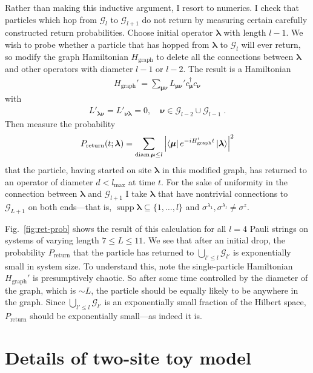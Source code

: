 \documentclass[aps,prb,nofootinbib,twocolumn,balancelastpage,amsmath,amssymb,floatfix,superscriptaddress,]{revtex4-1}
\newcommand{\graph}{\mathrm{graph}}
\DeclareMathOperator{\supp}{supp}
\DeclareMathOperator{\diam}{diam}
\newcommand{\pool}{\mathcal G}
\begin{document}
Rather than making this inductive argument, I resort to numerics.
I check that particles which hop from $\pool_l$ to $\pool_{l+1}$ do not return
by measuring certain carefully constructed return probabilities.
Choose initial operator $\bm \lambda$ with length $l-1$.
We wish to probe whether a particle that has hopped from $\bm \lambda$ to $\pool_{l}$ will ever return, so
modify the graph Hamiltonian $H_\graph$ to delete all the connections between $\bm \lambda$ and other operators with diameter $l-1$ or $l-2$.
The result is a Hamiltonian
\begin{align}
  \label{eq:Hgraph-ret-prob}
  H_\graph' =  \sum_{\bm \mu \bm \nu} L_{\bm \mu \bm \nu}' c^\dagger_{\bm \mu} c_{\bm \nu}
\end{align}
with
\begin{align}
  L'_{\bm\lambda \bm \nu} = L'_{\bm \nu \bm \lambda} = 0, \quad \bm \nu \in \pool_{l-2} \cup \pool_{l-1}\;.
\end{align}
Then measure the probability
\begin{align}
  P_{\text{return}}(t;\bm \lambda) = \sum_{\diam \bm \mu \le l} \left|\bra{\bm \mu} e^{-iH_\graph't} \ket{\bm \lambda}\right|^2
\end{align}
that the particle,
having started on site $\bm \lambda$ in this modified graph,
has returned to an operator of diameter $d < l_{\max}$ at time $t$.
For the sake of uniformity in the connection between $\bm \lambda$ and $\pool_{l+1}$
I take $\bm \lambda$ that have nontrivial connections to $\pool_{L+1}$ on both ends---that is, $\supp \bm \lambda \subseteq \{1, \dots, l\}$ and $\sigma^{\lambda_1}, \sigma^{\lambda_l} \ne \sigma^z$.

Fig.~\ref{fig:ret-prob} shows the result of this calculation
for all $l = 4$ Pauli strings
on systems of varying length $7 \le L \le 11$.
We see that after an initial drop, the probability $P_{\text{return}}$
that the particle has returned to $\bigcup_{l' \le l} \pool_{l'}$
is exponentially small in system size.
To understand this,
note the single-particle Hamiltonian $H_\graph'$ is presumptively chaotic.
So after some time controlled by the diameter of the graph, which is $\sim L$,
the particle should be equally likely to be anywhere in the graph.
Since $\bigcup_{l' \le l} \pool_{l'}$ is an exponentially small fraction of the Hilbert space,
$P_{\text{return}}$ should be exponentially small---as indeed it is.



\section{Details of two-site toy model}\label{app:toy}
\end{document}
